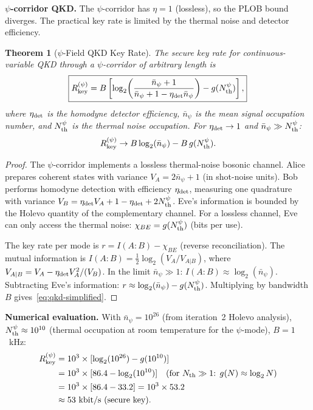 \documentclass[aps,prd,twocolumn,superscriptaddress,nofootinbib]{revtex4-2}
\newtheorem{theorem}{Theorem}
\begin{document}
\textbf{$\psi$-corridor QKD.}  The $\psi$-corridor has $\eta = 1$
(lossless), so the PLOB bound diverges.  The practical key rate is
limited by the thermal noise and detector efficiency.

\begin{theorem}[$\psi$-Field QKD Key Rate]
\label{thm:qkd}
The secure key rate for continuous-variable QKD through a
$\psi$-corridor of arbitrary length is
\begin{equation}
\boxed{
R_{\rm key}^{(\psi)} = B\left[\log_2\!\left(
\frac{\bar{n}_\psi + 1}{\bar{n}_\psi + 1 - \eta_{\rm det}\bar{n}_\psi}
\right) - g(N_{\rm th}^\psi)\right],
}
\label{eq:qkd-rate}
\end{equation}
where $\eta_{\rm det}$ is the homodyne detector efficiency,
$\bar{n}_\psi$ is the mean signal occupation number, and
$N_{\rm th}^\psi$ is the thermal noise occupation.
For $\eta_{\rm det} \to 1$ and $\bar{n}_\psi \gg N_{\rm th}^\psi$:
\begin{equation}
R_{\rm key}^{(\psi)} \to B\log_2(\bar{n}_\psi)
- B\,g(N_{\rm th}^\psi).
\label{eq:qkd-simplified}
\end{equation}
\end{theorem}

\begin{proof}
The $\psi$-corridor implements a lossless thermal-noise bosonic channel.
Alice prepares coherent states with variance $V_A = 2\bar{n}_\psi + 1$
(in shot-noise units).  Bob performs homodyne detection with efficiency
$\eta_{\rm det}$, measuring one quadrature with variance
$V_B = \eta_{\rm det}V_A + 1 - \eta_{\rm det} + 2N_{\rm th}^\psi$.
Eve's information is bounded by the Holevo quantity of the complementary
channel.  For a lossless channel, Eve can only access the thermal noise:
$\chi_{BE} = g(N_{\rm th}^\psi)$ (bits per use).

The key rate per mode is $r = I(A:B) - \chi_{BE}$ (reverse
reconciliation).  The mutual information is
$I(A:B) = \frac{1}{2}\log_2(V_A/V_{A|B})$, where
$V_{A|B} = V_A - \eta_{\rm det}V_A^2/(V_B)$.  In the limit
$\bar{n}_\psi \gg 1$:
$I(A:B) \approx \log_2(\bar{n}_\psi)$.  Subtracting Eve's information:
$r \approx \log_2(\bar{n}_\psi) - g(N_{\rm th}^\psi)$.
Multiplying by bandwidth $B$ gives~\eqref{eq:qkd-simplified}.
\end{proof}

\textbf{Numerical evaluation.}
With $\bar{n}_\psi = 10^{26}$ (from iteration~2 Holevo analysis),
$N_{\rm th}^\psi \approx 10^{10}$ (thermal occupation at room
temperature for the $\psi$-mode), $B = 1$~kHz:
\begin{align}
R_{\rm key}^{(\psi)} &= 10^3\times[\log_2(10^{26})
- g(10^{10})] \nonumber\\
&= 10^3\times[86.4 - \log_2(10^{10})]
\quad\text{(for $N_{\rm th} \gg 1$: $g(N) \approx \log_2 N$)}
\nonumber\\
&= 10^3\times[86.4 - 33.2] = 10^3\times 53.2 \nonumber\\
&\approx 53~\text{kbit/s (secure key)}.
\label{eq:qkd-numerical}
\end{align}
\end{document}
